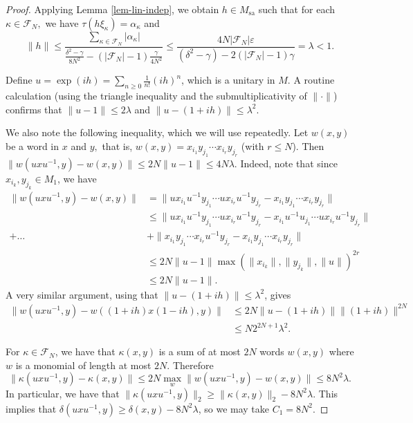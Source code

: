 \documentclass[10pt]{amsart}
\numberwithin{equation}{section}
\theoremstyle{definition}
\newcommand{\cF}{\mathcal{F}}
\newcommand{\ee}{\varepsilon}
\begin{document}
\begin{proof}
    
    
    
        
    Applying Lemma \ref{lem-lin-indep}, we obtain $h\in M_{\mathrm{sa}}$ such that for each $\kappa\in \cF_N,$ we have $\tau(h\xi_\kappa) =\alpha_\kappa$ and $$\|h\| \le \frac{\sum_{\kappa\in\cF_N} |\alpha_\kappa|}{\frac{\delta^2-\gamma}{8N^2} - (|\cF_N|-1)\frac{\gamma}{4N^2}} \le \frac{4N|\cF_N|\ee}{(\delta^2-\gamma) - 2(|\cF_N|-1)\gamma} = \lambda < 1.$$

    Define $u = \exp(ih) = \sum_{n\ge0}\frac{1}{n!}(ih)^n$, which is a unitary in $M$. A routine calculation (using the triangle inequality and the submultiplicativity of $\|\cdot\|$) confirms that $\|u-1\| \le 2\lambda$ and $\|u - (1+ih)\| \le \lambda^2$.

    We also note the following inequality, which we will use repeatedly. Let $w(x,y)$ be a word in $x$ and $y,$ that is, $w(x,y) = x_{i_1}y_{j_1}\cdots x_{i_r}y_{j_r}$ (with $r\le N$). Then $\|w(uxu^{-1},y) - w(x,y)\| \le 2N\|u-1\| \le 4N \lambda$. Indeed, note that since $x_{i_k},y_{j_k}\in M_1$, we have
    \begin{align*}
        \|w(uxu^{-1},y) - w(x,y)\| &= \|ux_{i_1}u^{-1}y_{j_1} \cdots ux_{i_{r}}u^{-1}y_{j_r} - x_{i_1}y_{j_1}\cdots x_{i_r}y_{j_r}\| \\
        &\le \|ux_{i_1}u^{-1}y_{j_1} \cdots ux_{i_{r}}u^{-1}y_{j_r} - x_{i_1}u^{-1}u_{j_1} \cdots ux_{i_{r}}u^{-1}y_{j_r}\|  \\
        +\ldots &+ \|x_{i_1}y_{j_1} \cdots x_{i_{r}}u^{-1}y_{j_r} - x_{i_1}y_{j_1} \cdots x_{i_{r}}y_{j_r}\| \\
        &\le 2N\|u-1\| \max(\|x_{i_k}\|,\|y_{j_k}\|,\|u\|)^{2r}\\
        &\le 2N\|u-1\|.
    \end{align*}
    A very similar argument, using that $\|u - (1+ih)\| \le \lambda^2$, gives 
    \begin{align*}
        \|w(uxu^{-1},y) - w((1+ih)x(1-ih),y)\| &\le 2N \|u-(1+ih)\|\|(1+ih)\|^{2N} \\
        &\le N2^{2N+1} \lambda^2.
    \end{align*}

    For $\kappa\in \cF_N$, we have that $\kappa(x,y)$ is a sum of at most $2N$ words $w(x,y)$ where $w$ is a monomial of length at most $2N$. Therefore $$\|\kappa(uxu^{-1},y) - \kappa(x,y)\| \le 2N \max_w \|w(uxu^{-1},y) - w(x,y)\| \le 8N^2\lambda.$$ In particular, we have that $\|\kappa(uxu^{-1},y)\|_2 \ge \|\kappa(x,y)\|_2 - 8N^2\lambda$. This implies that $\delta(uxu^{-1},y) \ge \delta(x,y) - 8N^2\lambda$, so we may take $C_1 = 8N^2$.


\end{proof}
\end{document}
